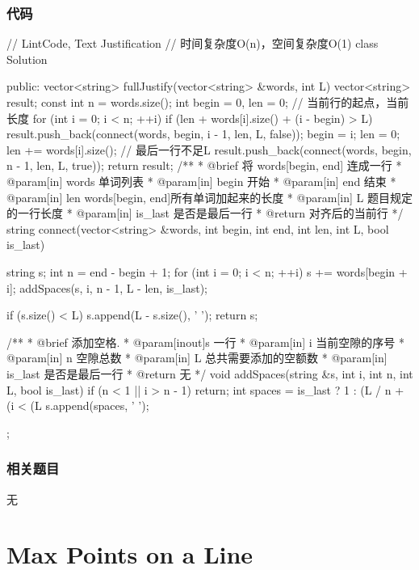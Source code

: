 \subsubsection{代码}
\begin{Code}
// LintCode, Text Justification
// 时间复杂度O(n)，空间复杂度O(1)
class Solution {
public:
    vector<string> fullJustify(vector<string> &words, int L) {
        vector<string> result;
        const int n = words.size();
        int begin = 0, len = 0; // 当前行的起点，当前长度
        for (int i = 0; i < n; ++i) {
            if (len + words[i].size() + (i - begin) > L) {
                result.push_back(connect(words, begin, i - 1, len, L, false));
                begin = i;
                len = 0;
            }
            len += words[i].size();
        }
        // 最后一行不足L
        result.push_back(connect(words, begin, n - 1, len, L, true));
        return result;
    }
    /**
     * @brief 将 words[begin, end] 连成一行
     * @param[in] words 单词列表
     * @param[in] begin 开始
     * @param[in] end 结束
     * @param[in] len words[begin, end]所有单词加起来的长度
     * @param[in] L 题目规定的一行长度
     * @param[in] is_last 是否是最后一行
     * @return 对齐后的当前行
     */
    string connect(vector<string> &words, int begin, int end,
            int len, int L, bool is_last) {
        string s;
        int n = end - begin + 1;
        for (int i = 0; i < n; ++i) {
            s += words[begin + i];
            addSpaces(s, i, n - 1, L - len, is_last);
        }

        if (s.size() < L) s.append(L - s.size(), ' ');
        return s;
    }

    /**
     * @brief 添加空格.
     * @param[inout]s 一行
     * @param[in] i 当前空隙的序号
     * @param[in] n 空隙总数
     * @param[in] L 总共需要添加的空额数
     * @param[in] is_last 是否是最后一行
     * @return 无
     */
    void addSpaces(string &s, int i, int n, int L, bool is_last) {
        if (n < 1 || i > n - 1) return;
        int spaces = is_last ? 1 : (L / n + (i < (L %
        s.append(spaces, ' ');
    }
};
\end{Code}


\subsubsection{相关题目}
\begindot
\item 无
\myenddot


\section{Max Points on a Line} %
\label{sec:Max-Points-on-a-Line}


